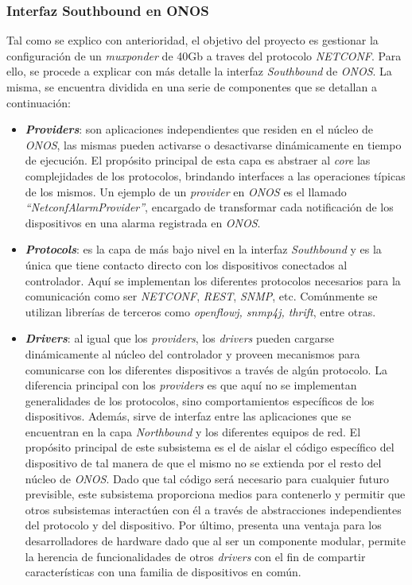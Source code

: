   \subsubsection{Interfaz Southbound en ONOS}
  Tal como se explico con anterioridad, el objetivo del proyecto es gestionar la configuración de un \textit{muxponder} de 40Gb a traves del protocolo \textit{NETCONF}. Para ello, se procede a explicar con más detalle la interfaz \textit{Southbound} de \textit{ONOS}. La misma, se encuentra dividida en una serie de componentes que se detallan a continuación:

  \begin{itemize}
	\item \textbf{\textit{Providers}}: son aplicaciones independientes que residen en el núcleo de \textit{ONOS}, las mismas pueden activarse o desactivarse dinámicamente en tiempo de ejecución. El propósito principal de esta capa es abstraer al \textit{core} las complejidades de los protocolos, brindando interfaces a las operaciones típicas de los mismos. Un ejemplo de un \textit{provider} en \textit{ONOS} es el llamado \textit{“NetconfAlarmProvider”}, encargado de transformar cada notificación de los dispositivos en una alarma registrada en \textit{ONOS}.
	\item \textbf{\textit{Protocols}}: es la capa de más bajo nivel en la interfaz \textit{Southbound} y es la única que tiene contacto directo con los dispositivos conectados al controlador. Aquí se implementan los diferentes protocolos necesarios para la comunicación como ser \textit{NETCONF}, \textit{REST}, \textit{SNMP}, etc. Comúnmente se utilizan librerías de terceros como \textit{openflowj, snmp4j, thrift}, entre otras.
	\item \textbf{\textit{Drivers}}: al igual que los \textit{providers}, los \textit{drivers} pueden cargarse dinámicamente al núcleo del controlador y proveen mecanismos para comunicarse con los diferentes dispositivos a través de algún protocolo. La diferencia principal con los \textit{providers} es que aquí no se implementan generalidades de los protocolos, sino comportamientos específicos de los dispositivos. Además, sirve de interfaz entre las aplicaciones que se encuentran en la capa \textit{Northbound} y los diferentes equipos de red.  El propósito principal de este subsistema es el de aislar el código específico del dispositivo de tal manera de que el mismo no se extienda por el resto del núcleo de \textit{ONOS}. Dado que tal código será necesario para cualquier futuro previsible, este subsistema proporciona medios para contenerlo y permitir que otros subsistemas interactúen con él a través de abstracciones independientes del protocolo y del dispositivo. Por último, presenta una ventaja para los desarrolladores de hardware dado que al ser un componente modular, permite la herencia de funcionalidades de otros \textit{drivers} con el fin de compartir características con una familia de dispositivos en común.
\end{itemize}

